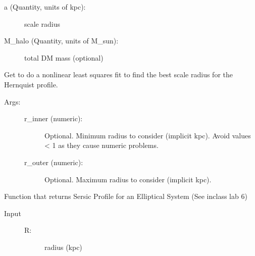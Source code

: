 \documentclass[letterpaper,10pt,english]{sphinxmanual}
\begin{document}
\begin{fulllineitems}
\begin{fulllineitems}
\begin{description}
\begin{description}
\item[{a (Quantity, units of kpc): }] \leavevmode
scale radius

\item[{M\_halo (Quantity, units of M\_sun): }] \leavevmode
total DM mass (optional)

\end{description}

\end{description}

\end{fulllineitems}


\begin{fulllineitems}
\label{\detokenize{massprofile:galaxy.massprofile.MassProfile.fit_hernquist_a}}
Get  to do a non\sphinxhyphen{}linear least squares fit to find
the best scale radius  for the Hernquist profile.
\begin{description}
\item[{Args:}] \leavevmode\begin{description}
\item[{r\_inner (numeric):}] \leavevmode
Optional. Minimum radius to consider (implicit kpc). 
Avoid values \textless{} 1 as they cause numeric problems.

\item[{r\_outer (numeric):}] \leavevmode
Optional. Maximum radius to consider (implicit kpc).

\end{description}

\end{description}

\end{fulllineitems}


\begin{fulllineitems}
\label{\detokenize{massprofile:galaxy.massprofile.MassProfile.sersic}}
Function that returns Sersic Profile for an Elliptical System
(See in\sphinxhyphen{}class lab 6)
\begin{description}
\item[{Input}] \leavevmode\begin{description}
\item[{R:}] \leavevmode
radius (kpc)


\end{description}
\end{description}
\end{fulllineitems}
\end{fulllineitems}
\end{document}
